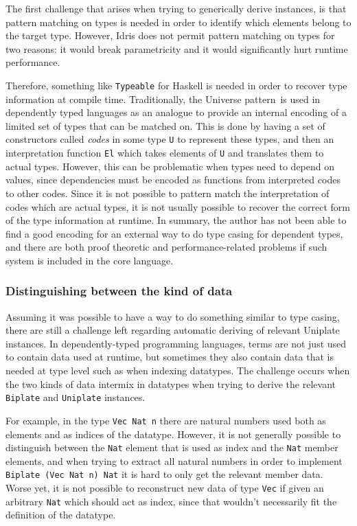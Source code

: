 \documentclass{ituthesis}
\newcommand{\tttype}[1]{\textcolor{type-color}{\texttt{#1}}}
\newcommand{\ttdec}[1]{\textcolor{declared-var-color}{\texttt{#1}}}
\newcommand{\ttvar}[1]{\textcolor{local-var-color}{\texttt{#1}}}
\theoremstyle{break}
\begin{document}
The first challenge that arises when trying to generically derive instances, is that pattern matching on types is needed in order to identify which elements belong to the target type.
However, Idris does not permit pattern matching on types for two reasons: it would break parametricity and it would significantly hurt runtime performance.

Therefore, something like \tttype{Typeable} for Haskell is needed in order to recover type information at compile time.
Traditionally, the Universe pattern\,\autocite{altenkirch2007generic} is used in dependently typed languages as an analogue to provide an internal encoding of a limited set of types that can be matched on.
This is done by having a set of constructors called \textit{codes} in some type \tttype{U} to represent these types, and then an interpretation function \ttdec{El} which takes elements of \tttype{U} and translates them to actual types.
However, this can be problematic when types need to depend on values, since dependencies must be encoded as functions from interpreted codes to other codes.
Since it is not possible to pattern match the interpretation of codes which are actual types, it is not usually possible to recover the correct form of the type information at runtime.
In summary, the author has not been able to find a good encoding for an external way to do type casing for dependent types, and there are both proof theoretic and performance-related problems if such system is included in the core language.

\subsubsection{Distinguishing between the kind of data}
\label{ssub:Distinguishing between the kind of data}
Assuming it was possible to have a way to do something similar to type casing, there are still a challenge left regarding automatic deriving of
relevant Uniplate instances.
In dependently-typed programming languages, terms are not just used to contain data used at runtime, but sometimes they also contain data
that is needed at type level such as when indexing datatypes.
The challenge occurs when the two kinds of data intermix in datatypes when trying to derive the relevant \tttype{Biplate} and \tttype{Uniplate} instances.

For example, in the type \tttype{Vec}~\tttype{Nat}~\ttvar{n} there are natural numbers used both as elements and as indices of the datatype.
However, it is not generally possible to distinguish between the \tttype{Nat} element that is used as index and the \tttype{Nat} member elements, and when trying to extract all natural numbers in order to implement \tttype{Biplate}~\texttt{(}\tttype{Vec Nat}~\ttvar{n}\texttt{)}~\tttype{Nat} it is hard to only get the relevant member data.
Worse yet, it is not possible to reconstruct new data of type \tttype{Vec} if given an arbitrary \tttype{Nat} which should act as index, since that wouldn't necessarily fit the definition of the datatype.
\end{document}
